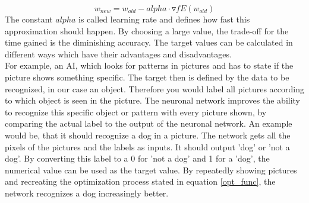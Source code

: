 \documentclass[12pt]{article}
\def\alpha{alpha}%
\begin{document}
\begin{equation} \label{opt_func}
    w_{new} = w_{old} - \alpha \cdot \triangledown f E(w_{old})
\end{equation}
The constant $\alpha$ is called \gls{learning rate} and defines how fast this approximation should happen. By choosing a large value, the trade-off for the time gained is the diminishing accuracy. The target values can be calculated in different ways which have their advantages and disadvantages. \\
For example, an \gls{AI}, which looks for patterns in pictures and has to state if the picture shows something specific. The \gls{target} then is defined by the data to be recognized, in our case an object. Therefore you would label all pictures according to which object is seen in the picture. The \gls{neuronal network} improves the ability to recognize this specific object or pattern with every picture shown, by comparing the actual label to the \gls{output} of the \gls{neuronal network}. An example would be, that it should recognize a dog in a picture. The network gets all the pixels of the pictures and the labels as \glspl{input}. It should \gls{output} 'dog' or 'not a dog'. By converting this label to a 0 for 'not a dog' and 1 for a 'dog', the numerical value can be used as the target value. By repeatedly showing pictures and recreating the optimization process stated in equation \ref{opt_func}, the network recognizes a dog increasingly better.
\end{document}
